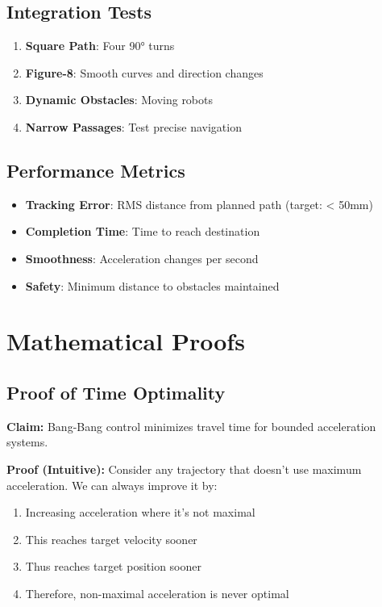 \documentclass[12pt,a4paper]{article}
\begin{document}
\subsection{Integration Tests}
\begin{enumerate}
    \item \textbf{Square Path}: Four 90° turns
    \item \textbf{Figure-8}: Smooth curves and direction changes
    \item \textbf{Dynamic Obstacles}: Moving robots
    \item \textbf{Narrow Passages}: Test precise navigation
\end{enumerate}

\subsection{Performance Metrics}
\begin{itemize}
    \item \textbf{Tracking Error}: RMS distance from planned path (target: < 50mm)
    \item \textbf{Completion Time}: Time to reach destination
    \item \textbf{Smoothness}: Acceleration changes per second
    \item \textbf{Safety}: Minimum distance to obstacles maintained
\end{itemize}

\appendix

\section{Mathematical Proofs}

\subsection{Proof of Time Optimality}

\textbf{Claim:} Bang-Bang control minimizes travel time for bounded acceleration systems.

\textbf{Proof (Intuitive):}
Consider any trajectory that doesn't use maximum acceleration. We can always improve it by:
\begin{enumerate}
    \item Increasing acceleration where it's not maximal
    \item This reaches target velocity sooner
    \item Thus reaches target position sooner
    \item Therefore, non-maximal acceleration is never optimal
\end{enumerate}
\end{document}
